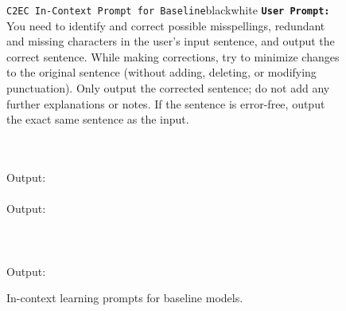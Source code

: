\begin{figure*}[p!]
\begin{promptbox}{\texttt{C2EC In-Context Prompt for Baseline}}{black}{white}
        \textbf{\texttt{User Prompt:}}\\
        You need to identify and correct possible misspellings, redundant and missing characters in the user's input sentence, and output the correct sentence. While making corrections, try to minimize changes to the original sentence (without adding, deleting, or modifying punctuation). Only output the corrected sentence; do not add any further explanations or notes. If the sentence is error-free, output the exact same sentence as the input.\return

        \return\\
        \phantom{Output:} \return\\
        Output: \return\return\\
        \phantom{Output:} \return\\
        Output: \return\return\\
        \return\return\\\\
        \phantom{Output:} \return\\
        Output:

    \end{promptbox}
    \caption{
        In-context learning prompts for baseline models.
    }
    \label{fig:icl_detail_prompt}
\end{figure*}

